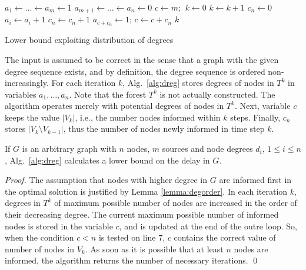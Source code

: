 
\begin{algorithm}
$a_1\leftarrow\dots\leftarrow a_{m}\leftarrow 1$\;%
$a_{m+1}\leftarrow\dots\leftarrow a_{n}\leftarrow 0$\;%
$c\leftarrow m$;%
$~k\leftarrow 0$\;
 {
$k\leftarrow k+1$\;
$c_n\leftarrow 0$\;
 {
	 {
		$a_i\leftarrow a_i + 1$\;
		$c_n\leftarrow c_n + 1$\;
		 {
			$a_{c+c_n}\leftarrow 1$; 
		}
	}
}
$c\leftarrow c + c_n$\;
}
\Return $k$\;
 \caption{Lower bound exploiting distribution of degrees}
\label{alg:dreg}
\end{algorithm}

The input is assumed to be correct in the sense that a graph with the given degree sequence exists, and by definition, the degree sequence is ordered non-increasingly.
For each iteration $k$, Alg.~\ref{alg:dreg} stores degrees of nodes in $T^k$ in variables $a_1,\dots,a_n$.
Note that the forest $T^k$ is not actually constructed. 
The algorithm operates merely with potential degrees of nodes in $T^k$.
Next, variable $c$ keeps the value $|V_k|$, i.e., the number nodes informed within $k$ steps.
Finally, $c_n$ stores $|V_k\setminus V_{k-1}|$, thus the number of nodes newly informed in time step $k$.

\begin{proposition}
If $G$ is an arbitrary graph with $n$ nodes, $m$ sources and node degrees $d_i$, $1\leq i\leq n$, Alg.~\ref{alg:dreg} calculates a lower bound on the delay in $G$.
\end{proposition}
\begin{proof}
The assumption that nodes with higher degree in $G$ are informed first in the optimal solution is justified by Lemma \ref{lemma:degorder}.
In each iteration $k$, degrees in $T^k$ of maximum possible number of nodes are increased in the order of their decreasing degree.
The current maximum possible number of informed nodes is stored in the variable $c$, and is updated at the end of the outre loop.
So, when the condition $c<n$ is tested on line 7, $c$ contains the correct value of number of nodes in $V_k$.
As soon as it is possible that at least $n$ nodes are informed, the algorithm returns the number of necessary iterations.
\qed
\end{proof}


